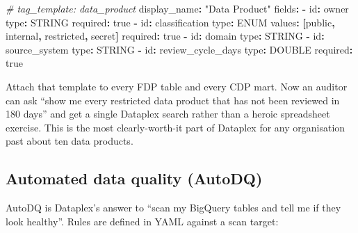 \documentclass[
  11pt,
  british,
  oneside]{book}
\newenvironment{Shaded}{\begin{snugshade}}{\end{snugshade}}
\newcommand{\AttributeTok}[1]{\textcolor[rgb]{0.77,0.63,0.00}{#1}}
\newcommand{\CharTok}[1]{\textcolor[rgb]{0.31,0.60,0.02}{#1}}
\newcommand{\CommentTok}[1]{\textcolor[rgb]{0.56,0.35,0.01}{\textit{#1}}}
\newcommand{\FunctionTok}[1]{\textcolor[rgb]{0.00,0.00,0.00}{#1}}
\newcommand{\KeywordTok}[1]{\textcolor[rgb]{0.13,0.29,0.53}{\textbf{#1}}}
\newcommand{\StringTok}[1]{\textcolor[rgb]{0.31,0.60,0.02}{#1}}
\begin{document}
\begin{Shaded}
\begin{Highlighting}[]
\CommentTok{\# tag\_template: data\_product}
\FunctionTok{display\_name}\KeywordTok{:}\AttributeTok{ }\StringTok{"Data Product"}
\FunctionTok{fields}\KeywordTok{:}
\AttributeTok{  }\KeywordTok{{-}}\AttributeTok{ }\FunctionTok{id}\KeywordTok{:}\AttributeTok{ owner}
\AttributeTok{    }\FunctionTok{type}\KeywordTok{:}\AttributeTok{ STRING}
\AttributeTok{    }\FunctionTok{required}\KeywordTok{:}\AttributeTok{ }\CharTok{true}
\AttributeTok{  }\KeywordTok{{-}}\AttributeTok{ }\FunctionTok{id}\KeywordTok{:}\AttributeTok{ classification}
\AttributeTok{    }\FunctionTok{type}\KeywordTok{:}\AttributeTok{ ENUM}
\AttributeTok{    }\FunctionTok{values}\KeywordTok{:}\AttributeTok{ }\KeywordTok{[}\AttributeTok{public}\KeywordTok{,}\AttributeTok{ internal}\KeywordTok{,}\AttributeTok{ restricted}\KeywordTok{,}\AttributeTok{ secret}\KeywordTok{]}
\AttributeTok{    }\FunctionTok{required}\KeywordTok{:}\AttributeTok{ }\CharTok{true}
\AttributeTok{  }\KeywordTok{{-}}\AttributeTok{ }\FunctionTok{id}\KeywordTok{:}\AttributeTok{ domain}
\AttributeTok{    }\FunctionTok{type}\KeywordTok{:}\AttributeTok{ STRING}
\AttributeTok{  }\KeywordTok{{-}}\AttributeTok{ }\FunctionTok{id}\KeywordTok{:}\AttributeTok{ source\_system}
\AttributeTok{    }\FunctionTok{type}\KeywordTok{:}\AttributeTok{ STRING}
\AttributeTok{  }\KeywordTok{{-}}\AttributeTok{ }\FunctionTok{id}\KeywordTok{:}\AttributeTok{ review\_cycle\_days}
\AttributeTok{    }\FunctionTok{type}\KeywordTok{:}\AttributeTok{ DOUBLE}
\AttributeTok{    }\FunctionTok{required}\KeywordTok{:}\AttributeTok{ }\CharTok{true}
\end{Highlighting}
\end{Shaded}

Attach that template to every FDP table and every CDP mart. Now an
auditor can ask ``show me every restricted data product that has not
been reviewed in 180 days'' and get a single Dataplex search rather than
a heroic spreadsheet exercise. This is the most clearly-worth-it part of
Dataplex for any organisation past about ten data products.

\hypertarget{automated-data-quality-autodq}{%
\subsection{Automated data quality
(AutoDQ)}\label{automated-data-quality-autodq}}

AutoDQ is Dataplex's answer to ``scan my BigQuery tables and tell me if
they look healthy''. Rules are defined in YAML
against a scan target:
\end{document}
